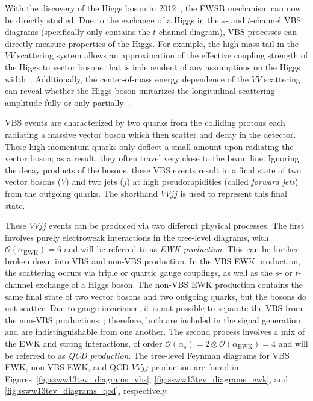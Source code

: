 With the discovery of the Higgs boson in 2012~\cite{HIGG-2012-27, CMS-HIG-12-028}, the EWSB mechanism can now be directly studied.
Due to the exchange of a Higgs in the $s$- and $t$-channel VBS diagrams (\ssww specifically only contains the $t$-channel diagram), VBS processes can directly measure properties of the Higgs.
For example, the high-mass tail in the $VV$ scattering system allows an approximation of the effective coupling strength of the Higgs to vector bosons that is independent of any assumptions on the Higgs width~\cite{2015.higgs-constraints-from-vbs}.
Additionally, the center-of-mass energy dependence of the $VV$ scattering can reveal whether the Higgs boson unitarizes the longitudinal scattering amplitude fully or only partially~\cite{2014.higgs-WW-scattering-theory}.

VBS events are characterized by two quarks from the colliding protons each radiating a massive vector boson which then scatter and decay in the detector.
These high-momentum quarks only deflect a small amount upon radiating the vector boson; as a result, they often travel very close to the beam line.
Ignoring the decay products of the bosons, these VBS events result in a final state of two vector bosons ($V$) and two jets ($j$) at high pseudorapidities (called \emph{forward jets}) from the outgoing quarks.
The shorthand $VVjj$ is used to represent this final state.

These $VVjj$ events can be produced via two different physical processes.
The first involves purely electroweak interactions in the tree-level diagrams, with $\mathcal{O}(\alpha_{\textrm{EWK}}) = 6$ %
and will be referred to as \emph{EWK production}.
This can be further broken down into VBS and non-VBS production.
In the VBS EWK production, the scattering occurs via triple or quartic gauge couplings, as well as the $s$- or $t$-channel exchange of a Higgs boson.
The non-VBS EWK production contains the same final state of two vector bosons and two outgoing quarks, but the bosons do not scatter.
Due to gauge invariance, it is not possible to separate the VBS from the non-VBS productions~\cite{2006.isolating-vbs-lhc}; therefore, both are included in the signal generation and are indistinguishable from one another.
The second process involves a mix of the EWK and strong interactions, of order $\mathcal{O}(\alpha_s) = 2 \otimes \mathcal{O}(\alpha_{\textrm{EWK}}) = 4$ and will be referred to as \emph{QCD production}.
The tree-level Feynman diagrams for VBS EWK, non-VBS EWK, and QCD $VVjj$ production are found in Figures~\ref{fig:ssww13tev_diagrams_vbs}, \ref{fig:ssww13tev_diagrams_ewk}, and \ref{fig:ssww13tev_diagrams_qcd}, respectively.

